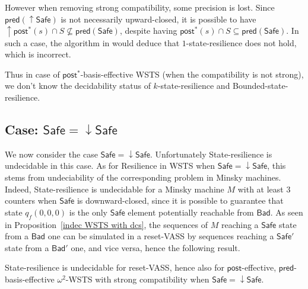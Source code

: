 \documentclass[runningheads]{llncs}
\newcommand{\alain}[1]{\todo[inline,color=red!20]{{\bf AF:} #1}}
\newcommand{\mathieu}[1]{\todo[inline,color=blue!20]{{\bf MH:} #1}}
\newcommand{\pred}{\textsf{pred}}
\newcommand{\post}{\textsf{post}}
\newcommand{\Bad}{\textsf{Bad}}
\newcommand{\Safe}{\textsf{Safe}}
\begin{document}
However when removing strong compatibility, some precision is lost.
Since $\pred(\mathop{\uparrow} \Safe)$ is not necessarily upward-closed, it is possible to have 
 $\mathop{\uparrow} \post^* (s) \cap S \not\subseteq \pred(\Safe)$,
despite having 
$\post^* (s) \cap S \subseteq \pred( \Safe)$.
In such a case, the algorithm in
\cite{DBLP:conf/gg/Ozkan22} would deduce that {\sc $1$-state-resilience} does not hold,
which is incorrect.

Thus in case of $\post^*$-basis-effective WSTS (when the compatibility is not strong), we don't know the decidability status of {\sc $k$-state-resilience} and 
{\sc Bounded-state-resilience}. 





\subsection{Case: $\Safe = \mathop{\downarrow} \Safe$}


We now consider the case $\Safe = \mathop{\downarrow} \Safe$.
%
Unfortunately {\sc State-resilience} is undecidable in this case. As for {\sc Resilience} in WSTS when $\Safe = \mathop{\downarrow} \Safe$, this stems from undeciability of the corresponding problem in Minsky machines.
Indeed, {\sc State-resilience} is undecidable for a Minsky machine $M$ with at least $3$ counters when
$\Safe$ is downward-closed, since it is possible to guarantee that state $q_f(0,0,0)$ is the only $\Safe$ element potentially reachable from $\Bad$.
 As seen in 
Proposition~\ref{indec WSTS with dcs},
 the sequences of $M$ reaching a $\Safe$ state from a $\Bad$ one can be simulated in a reset-VASS
by sequences reaching a $\Safe'$ state from a $\Bad'$ one,
 and vice versa, hence the following result. 


\begin{proposition}\label{srp down up}
{\sc State-resilience} is undecidable for reset-VASS, hence also for
$\post$-effective,
 $\pred$-basis-effective $\omega^2$-WSTS with strong compatibility
when
$\Safe=\mathop{\downarrow} \Safe$.
\end{proposition}
\end{document}
